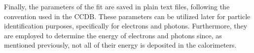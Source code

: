     Finally, the parameters of the fit are saved in plain text files, following the convention used in the CCDB.
    These parameters can be utilized later for particle identification purposes, specifically for electrons and photons.
    Furthermore, they are employed to determine the energy of electrons and photons since, as mentioned previously, not all of their energy is deposited in the calorimeters.
